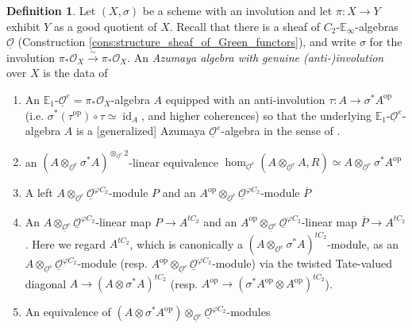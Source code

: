 \documentclass{article}
\DeclareMathOperator{\id}{id} %
\newcommand{\EE}{\mathbb{E}}
\newcommand{\op}{\mathrm{op}} %
\theoremstyle{definition}
\newtheorem{definition}[equation]{Definition}
\begin{document}
\begin{definition}
    Let $ (X, \sigma) $ be a scheme with an involution and let $ \pi \colon X \to Y $ exhibit $ Y $ as a good quotient of $ X $. 
    Recall that there is a sheaf of $ C_2 $-$ \EE_\infty $-algebras $ \underline{\mathcal{O}} $ (Construction \ref{cons:structure_sheaf_of_Green_functors}), and write $ \sigma $ for the involution $ \pi_* \mathcal{O}_X \xrightarrow{\sim} \pi_* \mathcal{O}_X $. 
    An \emph{Azumaya algebra with genuine (anti-)involution} over $ X $ is the data of 
    \begin{enumerate}[label=(\alph*)]
        \item An $ \EE_1 $-$ \underline{\mathcal{O}}^e = \pi_* \mathcal{O}_X $-algebra $ A $ equipped with an anti-involution $ \tau \colon A \to \sigma^* A^\op $ (i.e. $ \sigma^*(\tau^\op) \circ \tau \simeq \id_A $, and higher coherences) so that the underlying $ \EE_1 $-$ \underline{\mathcal{O}}^e $-algebra $ A $ is a [generalized] Azumaya $ \underline{\mathcal{O}}^e $-algebra in the sense of \cite[Definition 2.11]{MR2957304}. 
        \item \label{defnitem:global_Azumaya_alg_gi_underlying} an $ (A \otimes_{\underline{\mathcal{O}}^e} \sigma^* A)^{\otimes_{\underline{\mathcal{O}}^e} 2} $-linear equivalence $ \hom_{\underline{\mathcal{O}}^e}(A \otimes_{\underline{\mathcal{O}}^e} A, R) \simeq A \otimes_{\underline{\mathcal{O}}^e} \sigma^* A^\op $
        \item A left $ A \otimes_{\underline{\mathcal{O}}^e} \underline{\mathcal{O}}^{\varphi C_2} $-module $ P $ and an $ A^\op \otimes_{\underline{\mathcal{O}}^e} \underline{\mathcal{O}}^{\varphi C_2} $-module $ \overline{P} $
        \item \label{defn_item:global_Azumaya_gen_inv_conn_map} An $ A \otimes_{\underline{\mathcal{O}}^e} {\underline{\mathcal{O}}}^{\varphi C_2} $-linear map $ P \to A^{tC_2} $ and an $ A^\op \otimes_{\underline{\mathcal{O}}^e} {\underline{\mathcal{O}}}^{\varphi C_2} $-linear map $ \overline{P} \to A^{tC_2} $. 
        Here we regard $ A^{tC_2} $, which is canonically a $ (A \otimes_{\underline{\mathcal{O}}^e} \sigma^* A)^{tC_2} $-module, as an $ A \otimes_{\underline{\mathcal{O}}^e} \underline{\mathcal{O}}^{\varphi C_2} $-module (resp. $ A^\op \otimes_{\underline{\mathcal{O}}^e} \underline{\mathcal{O}}^{\varphi C_2} $-module) via the twisted Tate-valued diagonal $ A \to (A \otimes \sigma^* A)^{tC_2} $ (resp. $ A^\op \to (\sigma^* A^\op \otimes A^\op)^{tC_2} $). 
        \item \label{defn_item:global_Azumaya_gen_inv_geom_fixpt} An equivalence of $ \left(A \otimes \sigma^* A^\op\right) \otimes_{\underline{\mathcal{O}}^e} \underline{\mathcal{O}}^{\varphi C_2} $-modules 

\end{enumerate}
\end{definition}
\end{document}

